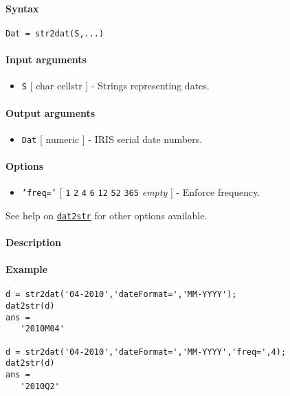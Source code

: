 


	\paragraph{Syntax}

\begin{verbatim}
Dat = str2dat(S,...)
\end{verbatim}

\paragraph{Input arguments}

\begin{itemize}
\itemsep1pt\parskip0pt
\item
  \texttt{S} {[} char \textbar{} cellstr {]} - Strings representing
  dates.
\end{itemize}

\paragraph{Output arguments}

\begin{itemize}
\itemsep1pt\parskip0pt
\item
  \texttt{Dat} {[} numeric {]} - IRIS serial date numbers.
\end{itemize}

\paragraph{Options}

\begin{itemize}
\itemsep1pt\parskip0pt
\item
  \texttt{'freq='} {[} \texttt{1} \textbar{} \texttt{2} \textbar{}
  \texttt{4} \textbar{} \texttt{6} \textbar{} \texttt{12} \textbar{}
  \texttt{52} \textbar{} \texttt{365} \textbar{} \emph{empty} {]} -
  Enforce frequency.
\end{itemize}

See help on \href{dates/dat2str}{\texttt{dat2str}} for other options
available.

\paragraph{Description}

\paragraph{Example}

\begin{verbatim}
d = str2dat('04-2010','dateFormat=','MM-YYYY');
dat2str(d)
ans =
   '2010M04'

d = str2dat('04-2010','dateFormat=','MM-YYYY','freq=',4);
dat2str(d)
ans =
   '2010Q2'
\end{verbatim}


